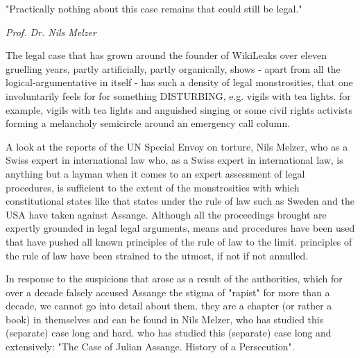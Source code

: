 \begin{multicols}{2}
\epigraph{"Practically nothing about this case remains that could still be legal."}{\textit{Prof. Dr. Nils Melzer}}



The legal case that has grown around the founder of WikiLeaks over eleven gruelling years, partly artificially, partly organically, shows - apart from all the logical-argumentative
in itself - has such a density of legal monstrosities, that one involuntarily feels for
for something DISTURBING, e.g. vigils with tea lights.
for example, vigils with tea lights and anguished singing or some civil rights activists forming a melancholy semicircle around an emergency call column.

%

A look at the reports of the UN Special Envoy on
torture, Nils Melzer, who as a Swiss expert in international law
who, as a Swiss expert in international law, is anything but a layman when it comes to an expert assessment of legal procedures, is sufficient to
the extent of the monstrosities with which constitutional states like
that states under the rule of law such as Sweden
and the USA have taken against Assange. Although
all the proceedings brought are expertly grounded in legal
legal arguments, means and procedures have been used that have pushed all known principles of the rule of law to the limit.
principles of the rule of law have been strained to the utmost, if not
if not annulled.

In response to the suspicions that arose as a result of the
authorities, which for over a decade falsely accused Assange
the stigma of "rapist" for more than a decade, we cannot go into detail about them.
they are a chapter (or rather a book) in themselves and can be found in
Nils Melzer, who has studied this (separate) case long and hard.
who has studied this (separate) case long and extensively:
"The Case of Julian Assange. History of a Persecution".


\end{multicols}
